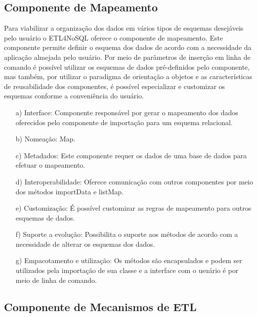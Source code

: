 \subsection{Componente de Mapeamento}

Para viabilizar a organização dos dados em vários tipos de esquemas desejáveis pelo usuário o ETL4NoSQL oferece o componente de mapeamento. Este componente permite definir o esquema dos dados de acordo com a necessidade da aplicação almejada pelo usuário. Por meio de parâmetros de inserção em linha de comando é possível utilizar os esquemas de dados pré-definidos pelo componente, mas também, por utilizar o paradigma de orientação a objetos e as características de reusabilidade dos componentes, é possível especializar e customizar os esquemas conforme a conveniência do usuário.

\begin{itemize}
	\item[a)] Interface: Componente responsável por gerar o mapeamento dos dados oferecidos pelo componente de importação para um esquema relacional.
	
	\item[b)] Nomeação: Map.
	
	\item[c)] Metadados: Este componente requer os dados de uma base de dados para efetuar o mapeamento.
	
	\item[d)] Interoperabilidade: Oferece comunicação com outros componentes por meio dos métodos importData e listMap.
	
	
	
	\item[e)] Customização: É possível customizar as regras de mapeamento para outros esquemas de dados.
	
	\item[f)] Suporte a evolução: Possibilita o suporte aos métodos de acordo com a necessidade de alterar os esquemas dos dados.
	
	\item[g)] Empacotamento e utilização: Os métodos são encapsulados e podem  ser utilizados pela importação de sua classe e a interface com o usuário é por meio de linha de comando.
	
\end{itemize}


\subsection{Componente de Mecanismos de ETL}

